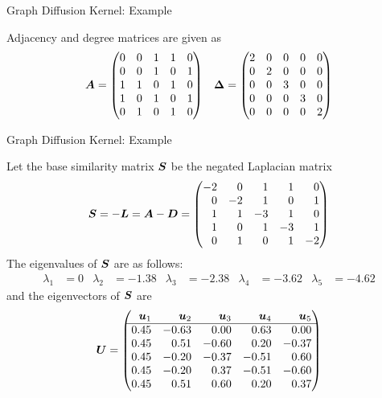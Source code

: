 \begin{frame}{Graph Diffusion Kernel: Example}
\centerline{
  \centering
    }

  Adjacency and degree matrices are given as
  \begin{align*}
    {\boldsymbol A} & = \begin{pmatrix} 
    0 & 0 & 1 & 1 & 0\\
    0 & 0 & 1 & 0 & 1\\
    1 & 1 & 0 & 1 & 0\\
    1 & 0 & 1 & 0 & 1\\
    0 & 1 & 0 & 1 & 0
     \end{pmatrix} &
    {\bm \Delta} = \begin{pmatrix} 
    2 & 0 & 0 & 0 & 0\\
    0 & 2 & 0 & 0 & 0\\
    0 & 0 & 3 & 0 & 0\\
    0 & 0 & 0 & 3 & 0\\
    0 & 0 & 0 & 0 & 2
     \end{pmatrix}
  \end{align*}
\end{frame}

\begin{frame}{Graph Diffusion Kernel: Example}

  Let the base similarity matrix ${\boldsymbol S}$ be the 
	negated Laplacian matrix
  \begin{align*}
    \bS = -\bL = \bA - \bD = \amatr{r}{
    -2 & 0 & 1 & 1 & 0\\
    0 & -2 & 1 & 0 & 1\\
    1 & 1 & -3 & 1 & 0\\
    1 & 0 & 1 & -3 & 1\\
    0 & 1 & 0 & 1 & -2
    }
  \end{align*}
  The eigenvalues of ${\boldsymbol S}$ are as
  follows:
  \begin{align*}
    \lambda_1 & = 0 & \lambda_2 & = -1.38 & \lambda_3 & = -2.38 &
    \lambda_4 & = -3.62 & \lambda_5 & = -4.62
  \end{align*}
  and the eigenvectors of ${\boldsymbol S}$ are
  \begin{align*}
 \bU = \amatr{r}{
 \bu_1 & \bu_2 & \bu_3 & \bu_4 & \bu_5\\
 \hline
0.45& -0.63&    0.00&   0.63&   0.00\\
0.45&  0.51&   -0.60&   0.20&  -0.37\\
0.45& -0.20&   -0.37&  -0.51&   0.60\\
0.45& -0.20&    0.37&  -0.51&  -0.60\\
0.45&  0.51&    0.60&   0.20&   0.37\\
}
  \end{align*}
\end{frame} 
 


